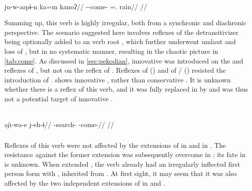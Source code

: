 \panare \parencite[][65]{panarepayne2013}\\
\begingl
\gla ju-w-əəpɨ-n ka=m kanoʔ//
\glb {}--come- =. rain//
\glft {}//
\endgl
\xe

Summing up, this verb is highly irregular, both from a synchronic and diachronic perspective.
The scenario suggested here involves reflexes of the detransitivizer  being optionally added to an  verb root , which further underwent umlaut and loss of , but in no systematic manner, resulting in the chaotic picture in \cref{tab:come}.
As discussed in \cref{sec:pekodian}, innovative  was introduced on the \ikpeng and \bakairi reflexes of , but not on the \arara reflex of .
Reflexes of  (\trio) and of / (\akuriyo) resisted the introduction of \PTir {}.
\carijo {} shows innovative , rather than conservative  .
It is unknown whether there is a \yukpa reflex of this verb, and it was fully replaced in \PWai by   and was thus not a potential target of innovative .

\carijo \parencite[][102]{guerrero2019carijo}\\
\begingl
\gla əji-wa-e j-eh-ɨ//
\glb {}-search- -come-//
\glft {}//
\endgl
\xe

\subsubsection{ }
\label{sec:godown}
Reflexes of this verb were not affected by the extensions of  in \PPek {} and  in \akuriyo {}.
The resistance against the former extension was subsequently overcome in \bakairi; its fate in \ikpeng is unknown.
When \akuriyo extended , the verb already had an irregularly inflected first person form with , inherited from \PTir.
At first sight, it may seem that it was also affected by the two independent extensions of  in \carijo {} and \yukpa {}.

